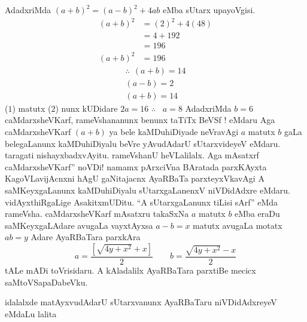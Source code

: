 AdadxriMda $(a+b)^2 = (a-b)^2 + 4ab$ eMba sUtarx upayoVgisi.
\begin{align*}
  (a+b)^2 & = (2)^2 +4 (48)\\
  & = 4+192\\
  & = 196\\
  (a+b)^2 & = 196   
\end{align*}
\begin{gather*}
  \therefore ~~ (a+b) = 14\\
  (a-b) =2 \tag{$1$}\\
  (a+b) = 14 \tag{$2$}
\end{gather*}
($1$) matutx ($2$) nunx kUDidare $2a = 16$ $\therefore$ ~$a=8$  AdadxriMda $b =6$
caMdarxsheVKarf, rameVshananunx benunx taTiTx BeVSf ! eMdaru Aga caMdarxsheVKarf
$(a+b)$ ya bele kaMDuhiDiyade neVravAgi $a$ matutx $b$ gaLa belegaLanunx kaMDuhiDiyalu beVre yAvudAdarU sUtarxvideyeV eMdaru. taragati nishayxbadxvAyitu. rameVshanU heVLalilalx. Aga mAsatxrf caMdarxsheVKarf'' noVDi! namamx pArxciVna BAratada parxKAyxta KagoVLavijAcnxni hAgU gaNitajacnx AyaRBaTa parxteyxVkavAgi A saMKeyxgaLanunx kaMDuhiDiyalu sUtarxgaLanenxV niVDidAdxre eMdaru.  vidAyxthiRgaLige AsakitxmUDitu. ``A sUtarxgaLanunx tiLisi sArf'' eMda rameVsha. caMdarxsheVKarf mAsatxru takaSxNa $a$ matutx $b$ eMba eraDu saMKeyxgaLAdare avugaLa vayxtAyxsa $a-b=x$ matutx avugaLa motatx $ab=y$ Adare AyaRBaTara parxkAra
$$
a = \frac{\left[\sqrt{4y+x^2} +x \right]}{2}\qquad  b = \frac{\sqrt{4y+x^2} - x}{2}
$$
tALe mADi toVrisidaru. A kAladalilx AyaRBaTara parxtiBe mecicx saMtoVSa\-paDabeVku.

idalalxde matAyxvudAdarU sUtarxvanunx AyaRBaTaru niVDidAdxreyeV eMdaLu lalita

